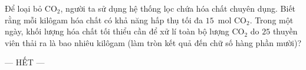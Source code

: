 	\begin{ex}%
		\label{NgheAn-SoGD-Lan2-III6}
		Để loại bỏ $\text{CO}_2$, người ta sử dụng hệ thống lọc chứa hóa chất chuyên dụng. Biết rằng mỗi kilôgam hóa chất có khả năng hấp thụ tối đa $15$~mol $\text{CO}_2$. Trong một ngày, khối lượng hóa chất tối thiểu cần để xử lí toàn bộ lượng $\text{CO}_2$ do $25$ thuyền viên thải ra là bao nhiêu kilôgam (làm tròn kết quả đến chữ số hàng phần mười)?
		\par
	\end{ex}

	\centerline{--- HẾT ---}



